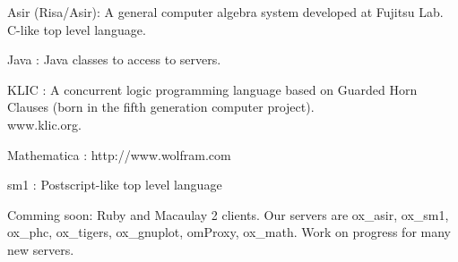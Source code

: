 \documentclass{slides}
\begin{document}

\noindent
{\color{red} Asir} (Risa/Asir):
A general computer algebra system developed at Fujitsu Lab.
C-like top level language.

\noindent
{\color{red} Java} :
Java classes to access to servers.

\noindent
{\color{red} KLIC } :
  A {\color{green} concurrent logic} programming language based
on Guarded Horn Clauses (born in the fifth generation computer project). \\
 {\color{green} www.klic.org}. 


\noindent
{\color{red} Mathematica}  : http://www.wolfram.com

\noindent
{\color{red} sm1} :
Postscript-like top level language

\bigbreak
\noindent
Comming soon: Ruby and Macaulay 2 clients.
Our servers are ox\_asir, ox\_sm1, ox\_phc, ox\_tigers, ox\_gnuplot,
omProxy, ox\_math. Work on progress for many new servers.

\medbreak
\vfill
\noindent
\rightline{\footnotesize {\color{red} {\tt http://www.openxm.org} }}
\end{document}
